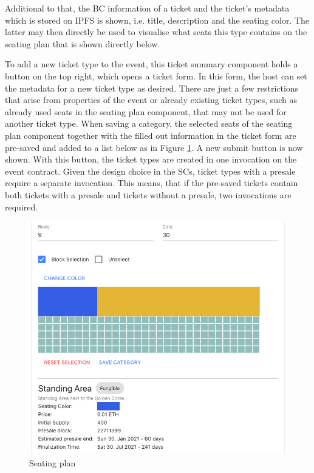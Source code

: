 Additional to that, the BC information of a ticket and the ticket's metadata which is stored on IPFS is shown, i.e. title, description and the seating color. The latter may then directly be used to visualise what seats this type contains on the seating plan that is shown directly below.

To add a new ticket type to the event, this ticket summary component holds a button on the top right, which opens a ticket form. In this form, the host can set the metadata for a new ticket type as desired. There are just a few restrictions that arise from properties of the event or already existing ticket types, such as already used seats in the seating plan component, that may not be used for another ticket type. When saving a category, the selected seats of the seating plan component together with the filled out information in the ticket form are pre-saved and added to a list below as in Figure \ref{img:host-seating-plan}. A new submit button is now shown. With this button, the ticket types are created in one invocation on the event contract. Given the design choice in the SCs, ticket types with a presale require a separate invocation. This means, that if the pre-saved tickets contain both tickets with a presale and tickets without a presale, two invocations are required.

\begin{figure}[hbt]
    \centering
    \includegraphics[width=14cm]{images/host-seating-plan.png}
    \caption{Seating plan \protect}
    \label{img:host-seating-plan}
\end{figure}

